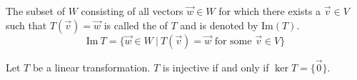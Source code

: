 \documentclass[11pt,fleqn]{book} %
\begin{document}
\setcounter{definitionT}{9}
\begin{definition}[Image]
    The subset of $W$ consisting of all vectors $\overrightarrow{w} \in W$ for which there exists a $\overrightarrow{v} \in V$ such that $T(\overrightarrow{v}) = \overrightarrow{w}$ is called the  of $T$ and is denoted by $\mathrm{Im}(T)$. $$\mathrm{Im}~T = \{ \overrightarrow{w} \in W ~|~ T(\overrightarrow{v}) = \overrightarrow{w} \text{ for some } \overrightarrow{v} \in V \}$$
\end{definition}

\setcounter{section}{0}
\begin{proposition}
    Let $T$ be a linear transformation. $T$ is injective if and only if $\ker T = \{ \overrightarrow{0} \}$. 
\end{proposition}
\end{document}
